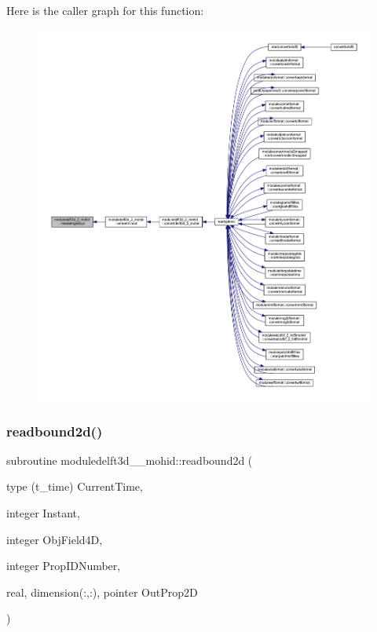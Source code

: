 Here is the caller graph for this function\+:\nopagebreak
\begin{figure}[H]
\begin{center}
\leavevmode
\includegraphics[width=350pt]{namespacemoduledelft3d__2__mohid_a8f18a6dd61d1e7402d91d20b87b39b18_icgraph}
\end{center}
\end{figure}
\mbox{\label{namespacemoduledelft3d__2__mohid_ad65093a68569d902890feaaea9871be5}} 
\subsubsection{\texorpdfstring{readbound2d()}{readbound2d()}}
{\footnotesize\ttfamily subroutine moduledelft3d\+\_\+\_\+mohid\+::readbound2d (\begin{DoxyParamCaption}\item[{type (t\+\_\+time)}]{Current\+Time,  }\item[{integer}]{Instant,  }\item[{integer}]{Obj\+Field4D,  }\item[{integer}]{Prop\+I\+D\+Number,  }\item[{real, dimension(\+:,\+:), pointer}]{Out\+Prop2D }\end{DoxyParamCaption})\hspace{0.3cm}{\ttfamily [private]}}

